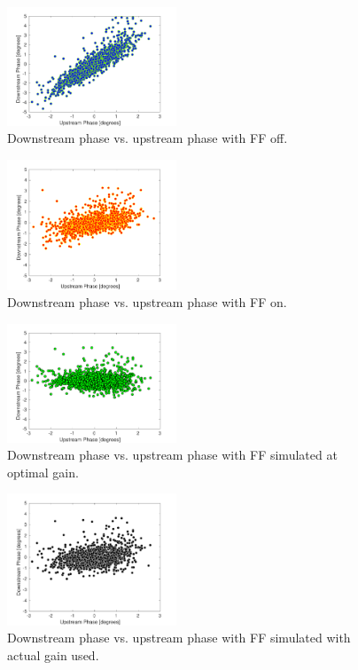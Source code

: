 \begin{figure}
  \centering
  \includegraphics[width=0.45\textwidth]{Figures/feedforward/longFF_scatterFFOff}
  \caption{Downstream phase vs. upstream phase with FF off.}
  \label{f:longFF_scatterFFOff}
\end{figure}

\begin{figure}
  \centering
  \includegraphics[width=0.45\textwidth]{Figures/feedforward/longFF_scatterFFOn}
  \caption{Downstream phase vs. upstream phase with FF on.}
  \label{f:longFF_scatterFFOn}
\end{figure}

\begin{figure}
  \centering
  \includegraphics[width=0.45\textwidth]{Figures/feedforward/longFF_scatterFFSimOpt}
  \caption{Downstream phase vs. upstream phase with FF simulated at optimal gain.}
  \label{f:longFF_scatterFFSimOpt}
\end{figure}

\begin{figure}
  \centering
  \includegraphics[width=0.45\textwidth]{Figures/feedforward/longFF_scatterFFSimReal}
  \caption{Downstream phase vs. upstream phase with FF simulated with actual gain used.}
  \label{f:longFF_scatterFFSimReal}
\end{figure}


